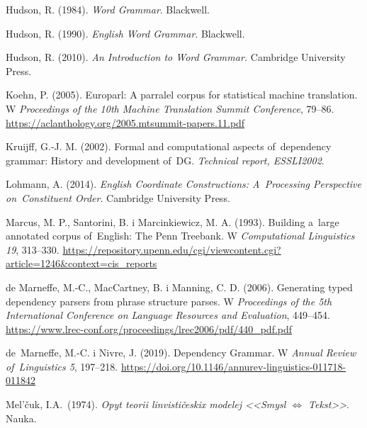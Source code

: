 \documentclass[licencjacka]{pracamgr_Kogni}
\begin{document}
\begin{thebibliography}{99}
        Hudson, R. (1984). \textit{Word Grammar}.
        Blackwell.

        Hudson, R. (1990). \textit{English Word Grammar}.
        Blackwell.

        Hudson, R. (2010). \textit{An Introduction to Word Grammar.} Cambridge University Press.

        Koehn, P. (2005).
        Europarl: A parralel corpus for statistical machine translation.
        W \textit{Proceedings of the 10th Machine Translation Summit Conference}, 79--86. \url{https://aclanthology.org/2005.mtsummit-papers.11.pdf}

        Kruijff, G.-J. M. (2002).
        Formal and computational aspects of~dependency grammar: History and development of~DG. \textit{Technical report, ESSLI2002}.

        Lohmann, A. (2014). \textit{English Coordinate Constructions: A~Processing Perspective on~Constituent Order}. Cambridge University Press.

        Marcus, M. P., Santorini, B. i Marcinkiewicz, M. A. (1993). Building a~large annotated corpus of~English: The Penn Treebank. W \textit{Computational Linguistics 19}, 313--330.
        \url{https://repository.upenn.edu/cgi/viewcontent.cgi?article=1246&context=cis_reports}

        de Marneffe, M.-C., MacCartney, B. i Manning, C. D. (2006).
        Generating typed dependency parsers from phrase structure parses.
        W \textit{Proceedings of the 5th International Conference on Language Resources and Evaluation}, 449--454. \url{https://www.lrec-conf.org/proceedings/lrec2006/pdf/440_pdf.pdf}

        de~Marneffe, M.-C. i Nivre, J. (2019).
        Dependency Grammar.
        W \textit{Annual Review of~Linguistics 5}, 197–218. \url{https://doi.org/10.1146/annurev-linguistics-011718-011842}

        Mel'čuk, I.A.\ (1974). \textit{Opyt teorii linvističeskix modelej <<Smysl $\Leftrightarrow$ Tekst>>}.
        Nauka.


\end{thebibliography}
\end{document}

